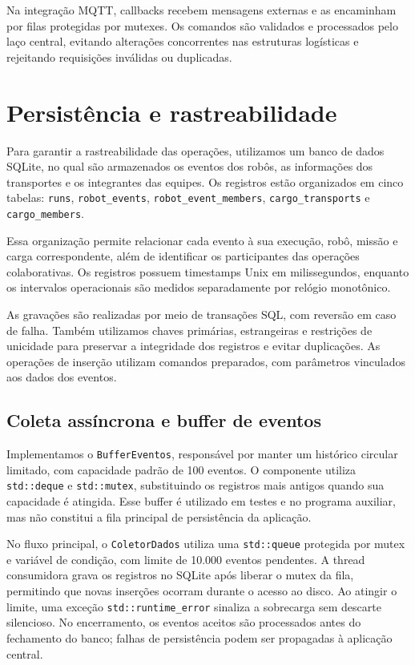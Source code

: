 \documentclass[12pt,a4paper]{article}
\newcommand{\code}[1]{\mbox{\texttt{#1}}}
\begin{document}
Na integração MQTT, callbacks recebem mensagens externas e as encaminham por
filas protegidas por mutexes. Os comandos são validados e processados pelo laço
central, evitando alterações concorrentes nas estruturas logísticas e
rejeitando requisições inválidas ou duplicadas.

\section{Persistência e rastreabilidade}
\label{sec:buffer-detalhe}

Para garantir a rastreabilidade das operações, utilizamos um banco de dados
SQLite, no qual são armazenados os eventos dos robôs, as informações dos
transportes e os integrantes das equipes. Os registros estão organizados em
cinco tabelas: \code{runs}, \code{robot\_events}, \code{robot\_event\_members},
\code{cargo\_transports} e \code{cargo\_members}.

Essa organização permite relacionar cada evento à sua execução, robô, missão e
carga correspondente, além de identificar os participantes das operações
colaborativas. Os registros possuem timestamps Unix em milissegundos, enquanto
os intervalos operacionais são medidos separadamente por relógio monotônico.

As gravações são realizadas por meio de transações SQL, com reversão em caso de
falha. Também utilizamos chaves primárias, estrangeiras e restrições de
unicidade para preservar a integridade dos registros e evitar duplicações. As
operações de inserção utilizam comandos preparados, com parâmetros vinculados
aos dados dos eventos.

\subsection{Coleta assíncrona e buffer de eventos}

Implementamos o \code{BufferEventos}, responsável por manter um histórico
circular limitado, com capacidade padrão de 100 eventos. O componente utiliza
\code{std::deque} e \code{std::mutex}, substituindo os registros mais antigos
quando sua capacidade é atingida. Esse buffer é utilizado em testes e no
programa auxiliar, mas não constitui a fila principal de persistência da
aplicação.

No fluxo principal, o \code{ColetorDados} utiliza uma \code{std::queue}
protegida por mutex e variável de condição, com limite de 10.000 eventos
pendentes. A thread consumidora grava os registros no SQLite após liberar o
mutex da fila, permitindo que novas inserções ocorram durante o acesso ao
disco. Ao atingir o limite, uma exceção \code{std::runtime\_error} sinaliza a
sobrecarga sem descarte silencioso. No encerramento, os eventos aceitos são
processados antes do fechamento do banco; falhas de persistência podem ser
propagadas à aplicação central.
\end{document}
